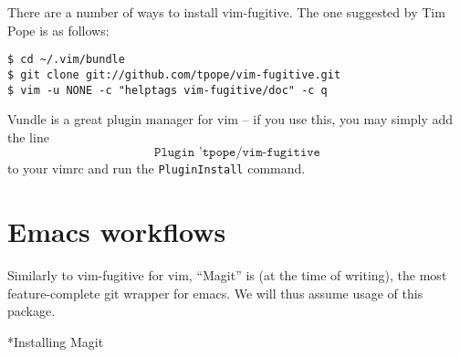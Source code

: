 \documentclass{amsart}
\makeatletter
\renewcommand\subsection{\@startsection{subsection}{2}%
  \z@{-.5\linespacing\@plus-.7\linespacing}{.5\linespacing}%
  {\normalfont\scshape}}
\makeatother
\begin{document}
There are a number of ways to install vim-fugitive. The one suggested
by Tim Pope is as follows:
\begin{verbatim}
$ cd ~/.vim/bundle
$ git clone git://github.com/tpope/vim-fugitive.git
$ vim -u NONE -c "helptags vim-fugitive/doc" -c q
\end{verbatim}
Vundle is a great plugin manager for vim -- if you use this, you may
simply add the line
\[
  \texttt{Plugin 'tpope/vim-fugitive}
\]
to your vimrc and run the \texttt{PluginInstall} command.

\section*{Emacs workflows}

Similarly to vim-fugitive for vim, “Magit” is (at the time of
writing), the most feature-complete git wrapper for emacs. We will
thus assume usage of this package.

\subsection*{Installing Magit}
\end{document}
